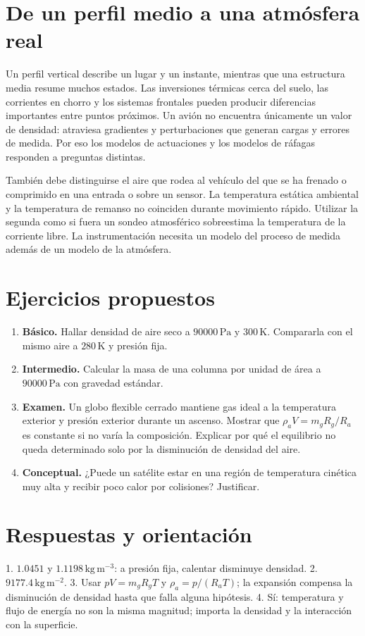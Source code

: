 \section{De un perfil medio a una atmósfera real}
Un perfil vertical describe un lugar y un instante, mientras que una estructura media resume muchos estados. Las inversiones térmicas cerca del suelo, las corrientes en chorro y los sistemas frontales pueden producir diferencias importantes entre puntos próximos. Un avión no encuentra únicamente un valor de densidad: atraviesa gradientes y perturbaciones que generan cargas y errores de medida. Por eso los modelos de actuaciones y los modelos de ráfagas responden a preguntas distintas.

También debe distinguirse el aire que rodea al vehículo del que se ha frenado o comprimido en una entrada o sobre un sensor. La temperatura estática ambiental y la temperatura de remanso no coinciden durante movimiento rápido. Utilizar la segunda como si fuera un sondeo atmosférico sobreestima la temperatura de la corriente libre. La instrumentación necesita un modelo del proceso de medida además de un modelo de la atmósfera.

\section{Ejercicios propuestos}
\begin{enumerate}
\item \textbf{Básico.} Hallar densidad de aire seco a $90000\,\mathrm{Pa}$ y $300\,\mathrm{K}$. Compararla con el mismo aire a $280\,\mathrm{K}$ y presión fija.
\item \textbf{Intermedio.} Calcular la masa de una columna por unidad de área a $90000\,\mathrm{Pa}$ con gravedad estándar.
\item \textbf{Examen.} Un globo flexible cerrado mantiene gas ideal a la temperatura exterior y presión exterior durante un ascenso. Mostrar que $\rho_aV=m_gR_g/R_a$ es constante si no varía la composición. Explicar por qué el equilibrio no queda determinado solo por la disminución de densidad del aire.
\item \textbf{Conceptual.} ¿Puede un satélite estar en una región de temperatura cinética muy alta y recibir poco calor por colisiones? Justificar.
\end{enumerate}
\section{Respuestas y orientación}
1. $1.0451$ y $1.1198\,\mathrm{kg\,m^{-3}}$: a presión fija, calentar disminuye densidad. 2. $9177.4\,\mathrm{kg\,m^{-2}}$. 3. Usar $pV=m_gR_gT$ y $\rho_a=p/(R_aT)$; la expansión compensa la disminución de densidad hasta que falla alguna hipótesis. 4. Sí: temperatura y flujo de energía no son la misma magnitud; importa la densidad y la interacción con la superficie.

